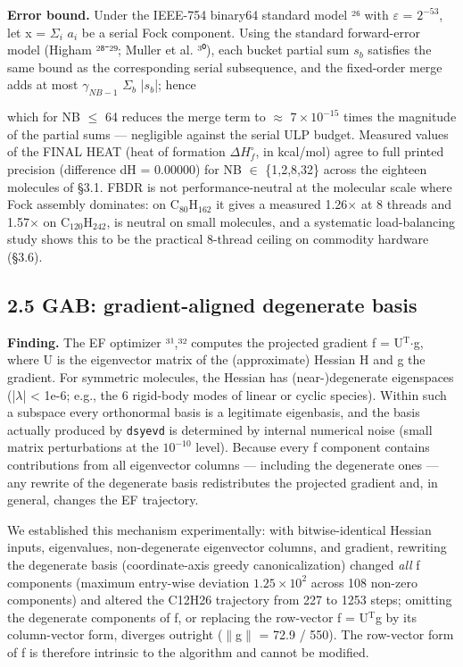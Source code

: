 \documentclass[preprint,12pt]{elsarticle}
\begin{document}
\textbf{Error bound.} Under the IEEE-754 binary64 standard model ²⁶ with $\varepsilon$ = $2^{-53}$, let x = $\Sigma_i$ $a_i$ be a serial Fock component. Using the standard forward-error model (Higham ²⁸⁻²⁹; Muller et al. ³⁰), each bucket partial sum $s_b$ satisfies the same bound as the corresponding serial subsequence, and the fixed-order merge adds at most $\gamma_{NB-1}$ $\Sigma_b$ |$s_b$|; hence

which for NB $\leq$ 64 reduces the merge term to $\approx$ $7\times 10^{-15}$ times the magnitude of the partial sums --- negligible against the serial ULP budget. Measured values of the FINAL HEAT (heat of formation $\Delta H_f^\circ$, in kcal/mol) agree to full printed precision (difference dH = 0.00000) for NB $\in$ \{1,2,8,32\} across the eighteen molecules of \S{}3.1. FBDR is not performance-neutral at the molecular scale where Fock assembly dominates: on C$_{80}$H$_{162}$ it gives a measured 1.26$\times$ at 8 threads and 1.57$\times$ on C$_{120}$H$_{242}$, is neutral on small molecules, and a systematic load-balancing study shows this to be the practical 8-thread ceiling on commodity hardware (\S{}3.6).


\subsection{2.5 GAB: gradient-aligned degenerate basis}
\textbf{Finding.} The EF optimizer ³¹,³² computes the projected gradient f = U$^\mathrm{T}$$\cdot$g, where U is the eigenvector matrix of the (approximate) Hessian H and g the gradient. For symmetric molecules, the Hessian has (near-)degenerate eigenspaces (|$\lambda$| < 1e-6; e.g., the 6 rigid-body modes of linear or cyclic species). Within such a subspace every orthonormal basis is a legitimate eigenbasis, and the basis actually produced by \texttt{dsyevd} is determined by internal numerical noise (small matrix perturbations at the $10^{-10}$ level). Because every f component contains contributions from all eigenvector columns --- including the degenerate ones --- any rewrite of the degenerate basis redistributes the projected gradient and, in general, changes the EF trajectory.

We established this mechanism experimentally: with bitwise-identical Hessian inputs, eigenvalues, non-degenerate eigenvector columns, and gradient, rewriting the degenerate basis (coordinate-axis greedy canonicalization) changed \textit{all} f components (maximum entry-wise deviation $1.25\times 10^{2}$ across 108 non-zero components) and altered the C12H26 trajectory from 227 to 1253 steps; omitting the degenerate components of f, or replacing the row-vector f = U$^\mathrm{T}$g by its column-vector form, diverges outright ($\|$g$\|$ = 72.9 / 550). The row-vector form of f is therefore intrinsic to the algorithm and cannot be modified.
\end{document}
